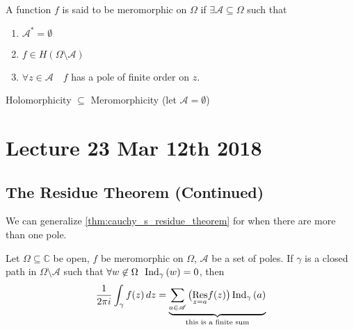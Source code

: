 \documentclass[notoc,notitlepage]{tufte-book}
\begin{document}
\begin{defn}\label{defn:meromorphic_functions}
  A function $f$ is said to be meromorphic on $\Omega$ if $\exists \mathscr{A} \subseteq \Omega$ such that
  \begin{enumerate}
    \item $\mathscr{A}^* = \emptyset$
    \item $f \in H(\Omega \setminus \mathscr{A})$
    \item $\forall z \in \mathscr{A} \quad f$ has a pole of finite order on $z$.
  \end{enumerate}
\end{defn}

\begin{remark}
  Holomorphicity $\subseteq$ Meromorphicity (let $\mathscr{A} = \emptyset$)
\end{remark}



\chapter{Lecture 23 Mar 12th 2018}
  \label{chapter:lecture_23_mar_12th_2018}

\section{The Residue Theorem (Continued)} %
\label{sec:the_residue_theorem_continued}

We can generalize \cref{thm:cauchy_s_residue_theorem} for when there are more than one pole.

\begin{thm}\label{thm:cauchy_s_residue_theorem_generalized}
  Let $\Omega \subseteq \mathbb{C}$ be open, $f$ be meromorphic on $\Omega$, $\mathscr{A}$ be a set of poles. If $\gamma$ is a closed path in $\Omega \setminus \mathscr{A}$ such that $\forall w \not\in \Omega \enspace \ind{w}{\gamma} = 0$, then
  \begin{equation*}
    \frac{1}{2 \pi i} \int_{\gamma} f(z) \dif{z} = \underbrace{\sum_{a \in \mathscr{A}} \big( \res{f(z)}{z = a} \big) \ind{a}{\gamma}}_{\text{this is a finite sum}}
  \end{equation*}
\end{thm}
\end{document}
